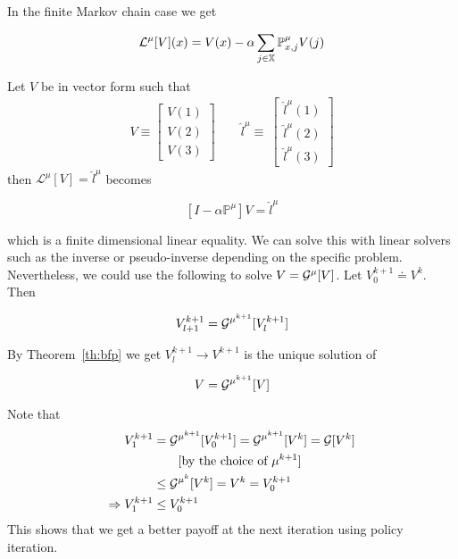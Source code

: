 In the finite Markov chain case we get

\begin{equation*}
\mathcal{L}^\mu[V](x) = V(x)-\alpha\sum_{j\in\mathbb{X}}\mathbb{P}_{x,j}^\mu V(j)
\end{equation*}

Let $V$ be in vector form such that
\begin{align*}
V\equiv\left[\begin{array}{c} V(1) \\ V(2) \\ V(3) \end{array}\right]
\qquad \hat{l}^\mu\equiv~\left[\begin{array}{c} \hat{l}^\mu(1) \\ \hat{l}^\mu(2) \\ \hat{l}^\mu(3) \end{array}\right]
\end{align*}
then $\mathcal{L}^\mu[V]=\hat{l}^\mu$ becomes

\begin{equation*}
\left[I-\alpha\mathbb{P}^\mu\right]V=\hat{l}^\mu
\end{equation*}

which is a finite dimensional linear equality.
We can solve this with linear solvers such as the inverse or pseudo-inverse depending on the specific problem.
Nevertheless, we could use the following to solve $V=\mathcal{G}^\mu[V]$.
Let $V_0^{k+1}\doteq V^k$.
Then

\begin{equation*}
V_{l+1}^{k+1}=\mathcal{G}^{\mu^{k+1}}[V_l^{k+1}]
\end{equation*}

By Theorem~\ref{th:bfp} we get $V_l^{k+1}\to V^{k+1}$ is the unique solution of

\begin{equation*}
V=\mathcal{G}^{\mu^{k+1}}[V]
\end{equation*}

Note that
\begin{align}
\label{eq:polpayoff}
V_1^{k+1} &= \mathcal{G}^{\mu^{k+1}}[V_0^{k+1}] = \mathcal{G}^{\mu^{k+1}}[V^k] = \mathcal{G}[V^k] \nonumber \\
&\qquad[\text{by the choice of } \mu^{k+1}] \nonumber \\
&\leq \mathcal{G}^{\mu^k}[V^k] = V^k = V_0^{k+1} \nonumber \\
\Rightarrow V_1^{k+1} &\leq V_0^{k+1}
\end{align}
This shows that we get a better payoff at the next iteration using policy iteration.

